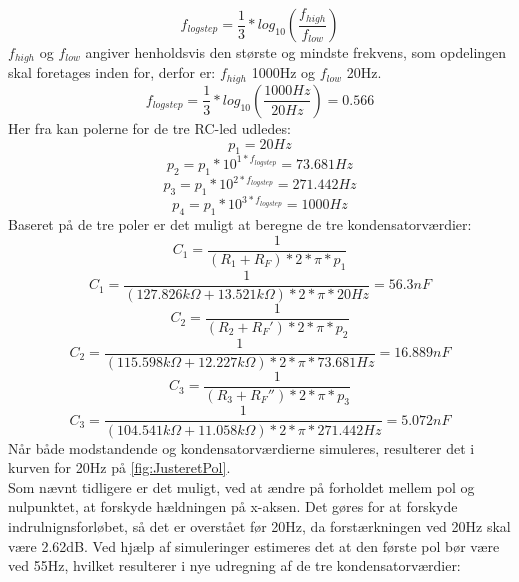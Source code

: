 %
\begin{equation}
	f_{logstep} = \frac{1}{3}*log_{10}\left(\frac{f_{high}}{f_{low}}\right)
\end{equation}
%
$f_{high}$ og $f_{low}$ angiver henholdsvis den største og mindste frekvens, som opdelingen skal foretages inden for, derfor er: $f_{high}$ 1000Hz og $f_{low}$ 20Hz.
%
\begin{equation}
	f_{logstep} = \frac{1}{3}*log_{10}\left(\frac{1000Hz}{20Hz}\right) = 0.566
\end{equation}
%
Her fra kan polerne for de tre RC-led udledes:
%
\begin{equation}
	p_1 = 20Hz
\end{equation}
%
\begin{equation}
	p_2 = p_1*10^{1*f_{logstep}} = 73.681Hz
\end{equation}
%
\begin{equation}
	p_3 = p_1*10^{2*f_{logstep}} = 271.442Hz
\end{equation}
%
\begin{equation}
	p_4 = p_1*10^{3*f_{logstep}} = 1000Hz
\end{equation}
%
Baseret på de tre poler er det muligt at beregne de tre kondensatorværdier:
%
\begin{equation}
	C_1 = \frac{1}{(R_1+R_F)*2*\pi*p_1} 
\end{equation}
%
\begin{equation}
	C_1 = \frac{1}{(127.826k\Omega+13.521k\Omega)*2*\pi*20Hz} = 56.3nF
\end{equation}
%
\begin{equation}
	C_2 = \frac{1}{(R_2+R_F')*2*\pi*p_2}
\end{equation}
%
\begin{equation}
	 C_2 = \frac{1}{(115.598k\Omega+12.227k\Omega)*2*\pi*73.681Hz} = 16.889nF
\end{equation}
%
\begin{equation}
	C_3 = \frac{1}{(R_3+R_F'')*2*\pi*p_3} 
\end{equation}
%
\begin{equation}
	C_3 = \frac{1}{(104.541k\Omega+11.058k\Omega)*2*\pi*271.442Hz} = 5.072nF
\end{equation}
%
Når både modstandende og kondensatorværdierne simuleres, resulterer det i  kurven for 20Hz på \autoref{fig:JusteretPol}. \\[5mm]
%
Som nævnt tidligere er det muligt, ved at ændre på forholdet mellem pol og nulpunktet, at forskyde hældningen på x-aksen. Det gøres for at forskyde indrulnignsforløbet, så det er overstået før 20Hz, da forstærkningen ved 20Hz skal være 2.62dB. Ved hjælp af simuleringer estimeres det at den første pol bør være ved 55Hz, hvilket resulterer i nye udregning af de tre kondensatorværdier:
